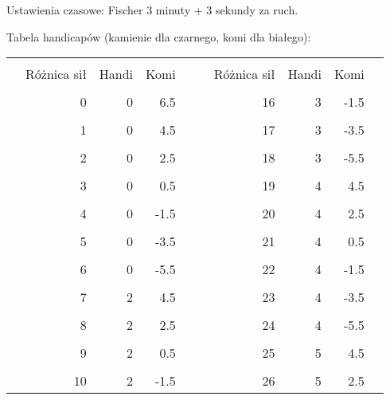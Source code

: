 



\vfil

Ustawienia czasowe: Fischer 3 minuty + 3 sekundy za ruch.

\vfil

Tabela handicapów (kamienie dla czarnego, komi dla białego):

\vfil

\begin{tabularx}{\textwidth}{| X r r r X | X r r r X |}
\hline
&&&&&&&&& \\[-1.1em] & Różnica sił & Handi & Komi & & & Różnica sił & Handi & Komi & \\[.2em] \hline
&&&&&&&&& \\[-1.1em] &           0 &     0 &  6.5 & & &          16 &     3 & -1.5 & \\[.2em] \hline
&&&&&&&&& \\[-1.1em] &           1 &     0 &  4.5 & & &          17 &     3 & -3.5 & \\[.2em] \hline
&&&&&&&&& \\[-1.1em] &           2 &     0 &  2.5 & & &          18 &     3 & -5.5 & \\[.2em] \hline
&&&&&&&&& \\[-1.1em] &           3 &     0 &  0.5 & & &          19 &     4 &  4.5 & \\[.2em] \hline
&&&&&&&&& \\[-1.1em] &           4 &     0 & -1.5 & & &          20 &     4 &  2.5 & \\[.2em] \hline
&&&&&&&&& \\[-1.1em] &           5 &     0 & -3.5 & & &          21 &     4 &  0.5 & \\[.2em] \hline
&&&&&&&&& \\[-1.1em] &           6 &     0 & -5.5 & & &          22 &     4 & -1.5 & \\[.2em] \hline
&&&&&&&&& \\[-1.1em] &           7 &     2 &  4.5 & & &          23 &     4 & -3.5 & \\[.2em] \hline
&&&&&&&&& \\[-1.1em] &           8 &     2 &  2.5 & & &          24 &     4 & -5.5 & \\[.2em] \hline
&&&&&&&&& \\[-1.1em] &           9 &     2 &  0.5 & & &          25 &     5 &  4.5 & \\[.2em] \hline
&&&&&&&&& \\[-1.1em] &          10 &     2 & -1.5 & & &          26 &     5 &  2.5 & \\[.2em] \hline

\end{tabularx}
